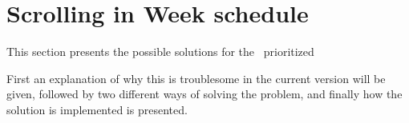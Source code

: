 \section{Scrolling in Week schedule}

This section presents the possible solutions for the \phigh~prioritized

First an explanation of why this is troublesome in the current version will be given, followed by two different ways of solving the problem, and finally how the solution is implemented is presented.


